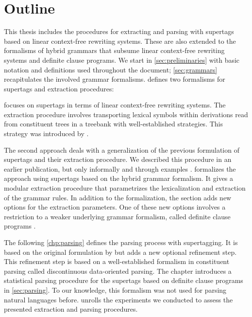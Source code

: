\documentclass[../document.tex]{subfiles}
\begin{document}
    \section*{Outline}
    This thesis includes the procedures for extracting and parsing with supertags based on linear context-free rewriting systems.
    These are also extended to the formalisms of hybrid grammars that subsume linear context-free rewriting systems and definite clause programs.
    We start in \cref{sec:preliminaries} with basic notation and definitions used throughout the document; \cref{sec:grammars} recapitulates the involved grammar formalisms.
     defines two formalisms for supertags and extraction procedures:
    \begin{compactitem}
        \item {} focuses on supertags in terms of linear context-free rewriting systems.
            The extraction procedure involves transporting lexical symbols within derivations read from constituent trees in a treebank with well-established strategies.
            This strategy was introduced by \citet{RupMoe21}.
        \item The second approach deals with a generalization of the previous formulation of supertags and their extraction procedure.
            We described this procedure in an earlier publication, but only informally and through examples .
             formalizes the approach using supertags based on the hybrid grammar formalism.
            It gives a modular extraction procedure that parametrizes the lexicalization and extraction of the grammar rules.
            In addition to the formalization, the section adds new options for the extraction parameters.
            One of these new options involves a restriction to a weaker underlying grammar formalism, called definite clause programs \citep{Der85}.
    \end{compactitem}
    The following \cref{chp:parsing} defines the parsing process with supertagging.
    It is based on the original formulation by \citet{bangalore1999supertagging} but adds a new optional refinement step.
    This refinement step is based on a well-established formalism in constituent parsing called discontinuous data-oriented parsing.
    The chapter introduces a statistical parsing procedure for the supertags based on definite clause programs in \cref{sec:parsing}. To our knowledge, this formalism was not used for parsing natural languages before.
     unrolls the experiments we conducted to assess the presented extraction and parsing procedures.
\end{document}
